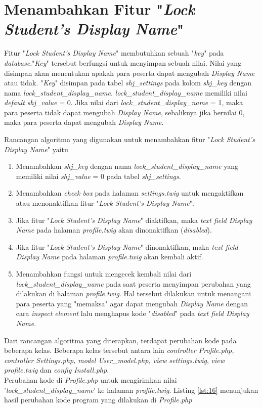 \section{Menambahkan Fitur "\textit{Lock Student's Display Name}"}
\label{chap:lock}
Fitur "\textit{Lock Student's Display Name}" membutuhkan sebuah "\textit{key}" pada \textit{database}."\textit{Key}" tersebut berfungsi untuk menyimpan sebuah nilai. Nilai yang disimpan akan menentukan apakah para peserta dapat mengubah \textit{Display Name} atau tidak. "\textit{Key}" disimpan pada tabel \textit{shj\_settings} pada kolom \textit{shj\_key} dengan nama \textit{lock\_student\_display\_name}. \textit{lock\_student\_display\_name} memiliki nilai \textit{default shj\_value} = 0. Jika nilai dari \textit{lock\_student\_display\_name} = 1, maka para peserta tidak dapat mengubah \textit{Display Name}, sebaliknya jika bernilai 0, maka para peserta dapat mengubah \textit{Display Name}.

Rancangan algoritma yang digunakan untuk menambahkan fitur "\textit{Lock Student's Display Name}" yaitu
\begin{enumerate}
	\item Menambahkan \textit{shj\_key} dengan nama \textit{lock\_student\_display\_name} yang memiliki nilai \textit{shj\_value} = 0 pada tabel \textit{shj\_settings}.
	\item Menambahkan \textit{check box} pada halaman \textit{settings.twig} untuk mengaktifkan atau menonaktifkan fitur "\textit{Lock Student's Display Name}".
	\item Jika fitur "\textit{Lock Student's Display Name}" diaktifkan, maka \textit{text field Display Name} pada halaman \textit{profile.twig} akan dinonaktifkan (\textit{disabled}).
	\item Jika fitur "\textit{Lock Student's Display Name}" dinonaktifkan, maka \textit{text field Display Name} pada halaman \textit{profile.twig} akan kembali aktif.
	\item Menambahkan fungsi untuk mengecek kembali nilai dari \textit{lock\_student\_display\_name} pada saat peserta menyimpan perubahan yang dilakukan di halaman \textit{profile.twig}. Hal tersebut dilakukan untuk menangani para peserta yang "memaksa" agar dapat mengubah \textit{Display Name} dengan cara \textit{inspect element} lalu menghapus kode "\textit{disabled}" pada \textit{text field Display Name}.
\end{enumerate}

Dari rancangan algoritma yang diterapkan, terdapat perubahan kode pada beberapa kelas. Beberapa kelas tersebut antara lain \textit{controller Profile.php, controller Settings.php, model User\_model.php, view settings.twig}, \textit{view profile.twig} dan \textit{config Install.php}.
~\\
Perubahan  kode di \textit{Profile.php} untuk mengirimkan nilai '\textit{lock\_student\_display\_name}' ke halaman \textit{profile.twig}. Listing \ref{lst:16} menunjukan hasil perubahan kode program yang dilakukan di \textit{Profile.php}

